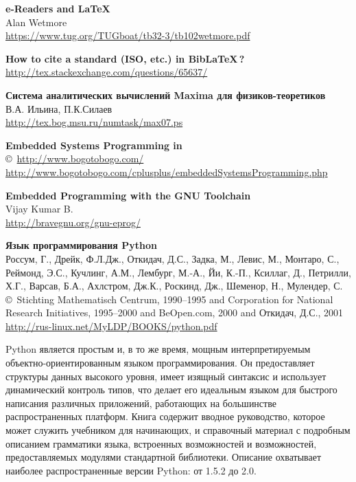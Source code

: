 \begin{thebibliography}{99}
\textbf{e-Readers and \LaTeX}\\
Alan Wetmore\\
\url{https://www.tug.org/TUGboat/tb32-3/tb102wetmore.pdf}

\textbf{How to cite a standard (ISO, etc.) in Bib\LaTeX\,?}\\
\url{http://tex.stackexchange.com/questions/65637/}


\textbf{Система аналитических вычислений Maxima для физиков-теоретиков}\\
В.А. Ильина, П.К.Силаев\\
\url{http://tex.bog.msu.ru/numtask/max07.ps} 




\textbf{Embedded Systems Programming in \cpp}\\
\copyright\ \url{http://www.bogotobogo.com/}\\
\url{http://www.bogotobogo.com/cplusplus/embeddedSystemsProgramming.php}

\textbf{Embedded Programming with the GNU Toolchain}\\
Vijay Kumar B.\\
\url{http://bravegnu.org/gnu-eprog/}


\textbf{Язык программирования Python}\\
Россум, Г., Дрейк, Ф.Л.Дж., Откидач, Д.С., Задка, М.,  Левис, М.,  Монтаро, С.,
Реймонд, Э.С., Кучлинг, А.М.,  Лембург, М.-А.,  Йи, К.-П.,  Ксиллаг, Д.,
Петрилли, Х.Г., Варсав, Б.А.,  Ахлстром, Дж.К.,  Роскинд, Дж.,  Шеменор, Н.,
Мулендер, С.\\
\copyright\ Stichting Mathematisch Centrum, 1990–1995
and Corporation for National Research Initiatives, 1995–2000
and BeOpen.com, 2000
and Откидач, Д.С., 2001 \\
\url{http://rus-linux.net/MyLDP/BOOKS/python.pdf}

Python является простым и, в то же время, мощным интерпретируемым
объектно-ориентированным языком программирования. Он предоставляет структуры
данных высокого уровня, имеет изящный синтаксис и использует динамический
контроль типов, что делает его идеальным языком для быстрого написания различных
приложений, работающих на большинстве распространенных платформ. Книга содержит
вводное руководство, которое может служить учебником для начинающих, и
справочный материал с подробным описанием грамматики языка, встроенных
возможностей и возможностей, предоставляемых модулями стандартной библиотеки.
Описание охватывает наиболее распространенные версии Python: от 1.5.2 до 2.0.


\end{thebibliography}
